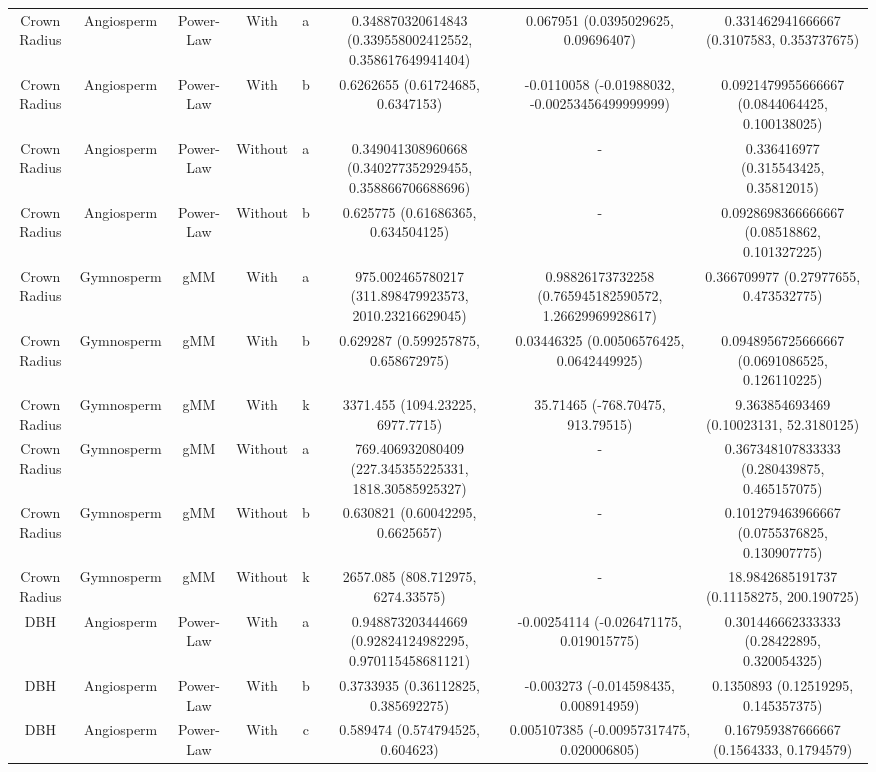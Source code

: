 \documentclass[
  12pt,
  letterpaper,
  DIV=11,
  numbers=noendperiod]{scrartcl}
\begin{document}
\begin{longtable*}[t]{cccccccc}
Crown Radius & Angiosperm & Power-Law & With & a & 0.348870320614843 (0.339558002412552, 0.358617649941404) & 0.067951 (0.0395029625, 0.09696407) & 0.331462941666667 (0.3107583, 0.353737675)\\
Crown Radius & Angiosperm & Power-Law & With & b & 0.6262655 (0.61724685, 0.6347153) & -0.0110058 (-0.01988032, -0.00253456499999999) & 0.0921479955666667 (0.0844064425, 0.100138025)\\
Crown Radius & Angiosperm & Power-Law & Without & a & 0.349041308960668 (0.340277352929455, 0.358866706688696) & - & 0.336416977 (0.315543425, 0.35812015)\\
\addlinespace
Crown Radius & Angiosperm & Power-Law & Without & b & 0.625775 (0.61686365, 0.634504125) & - & 0.0928698366666667 (0.08518862, 0.101327225)\\
Crown Radius & Gymnosperm & gMM & With & a & 975.002465780217 (311.898479923573, 2010.23216629045) & 0.98826173732258 (0.765945182590572, 1.26629969928617) & 0.366709977 (0.27977655, 0.473532775)\\
Crown Radius & Gymnosperm & gMM & With & b & 0.629287 (0.599257875, 0.658672975) & 0.03446325 (0.00506576425, 0.0642449925) & 0.0948956725666667 (0.0691086525, 0.126110225)\\
Crown Radius & Gymnosperm & gMM & With & k & 3371.455 (1094.23225, 6977.7715) & 35.71465 (-768.70475, 913.79515) & 9.363854693469 (0.10023131, 52.3180125)\\
Crown Radius & Gymnosperm & gMM & Without & a & 769.406932080409 (227.345355225331, 1818.30585925327) & - & 0.367348107833333 (0.280439875, 0.465157075)\\
\addlinespace
Crown Radius & Gymnosperm & gMM & Without & b & 0.630821 (0.60042295, 0.6625657) & - & 0.101279463966667 (0.0755376825, 0.130907775)\\
Crown Radius & Gymnosperm & gMM & Without & k & 2657.085 (808.712975, 6274.33575) & - & 18.9842685191737 (0.11158275, 200.190725)\\
DBH & Angiosperm & Power-Law & With & a & 0.948873203444669 (0.92824124982295, 0.970115458681121) & -0.00254114 (-0.026471175, 0.019015775) & 0.301446662333333 (0.28422895, 0.320054325)\\
DBH & Angiosperm & Power-Law & With & b & 0.3733935 (0.36112825, 0.385692275) & -0.003273 (-0.014598435, 0.008914959) & 0.1350893 (0.12519295, 0.145357375)\\
DBH & Angiosperm & Power-Law & With & c & 0.589474 (0.574794525, 0.604623) & 0.005107385 (-0.00957317475, 0.020006805) & 0.167959387666667 (0.1564333, 0.1794579)\\

\end{longtable*}
\end{document}

